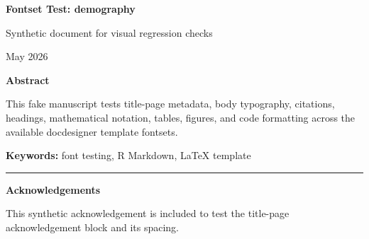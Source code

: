 \documentclass[12pt]{article}
\newif\ifdocdesigneranon
\begin{document}
\begin{titlepage}
\thispagestyle{empty}

\vspace*{0.14\textheight}
\begin{center}


{\LARGE\bfseries Fontset Test: demography\par}

\vspace{0.25em}
{\large Synthetic document for visual regression checks\par}

\vspace{2em}

\begin{singlespace}
{\normalsize

\docdesignerauthorblock

\par\vspace{2\baselineskip}
\docdesignerseriesblock

\ifdocdesigneranon\else
\vspace{0.5em}
{\small May 2026}\par
\fi

}
\end{singlespace}


\vspace{2em}

\begin{minipage}{0.8\textwidth}
\small\singlespacing
\textbf{Abstract}\par\vspace{0.25em}
This fake manuscript tests title-page metadata, body typography,
citations, headings, mathematical notation, tables, figures, and code
formatting across the available docdesigner template fontsets.
\par\vspace{1em}
\noindent\textbf{Keywords: }font testing, R Markdown, LaTeX template
\end{minipage}

\vfill

\ifdocdesigneranon\else
\begin{minipage}{0.8\textwidth}
\footnotesize\singlespacing
\noindent\rule{0.3\textwidth}{0.4pt}\par
\textbf{Acknowledgements}\par
This synthetic acknowledgement is included to test the title-page
acknowledgement block and its spacing.
\end{minipage}
\fi

\end{center}
\end{titlepage}
\fi\fi
\fi\fi
\end{document}
